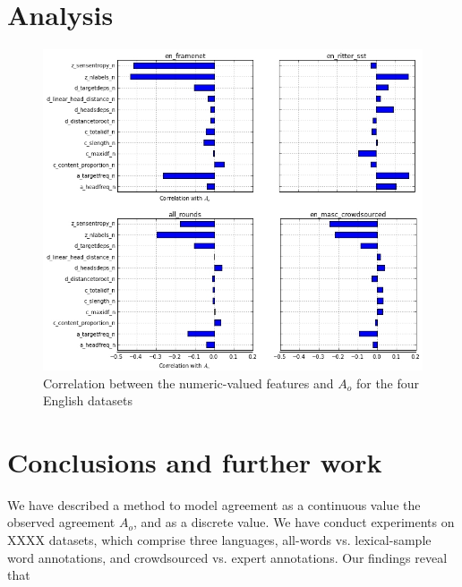 \documentclass[11pt,a4paper]{article}
\begin{document}
%

%
%

\section{Analysis}

\begin{figure}[htt]
\includegraphics[scale=0.3]{corrtable.jpg}

\caption{ \label{fig:correlations}Correlation between the numeric-valued features and $A_o$ for the four English datasets}    
\end{figure}

\section{Conclusions and further work}

We have described a method to model agreement as a continuous value  the observed agreement $A_o$, and as a discrete value. We have conduct experiments on XXXX datasets, which comprise three languages, all-words vs. lexical-sample word annotations, and crowdsourced vs. expert annotations. Our findings reveal that 
\end{document}
